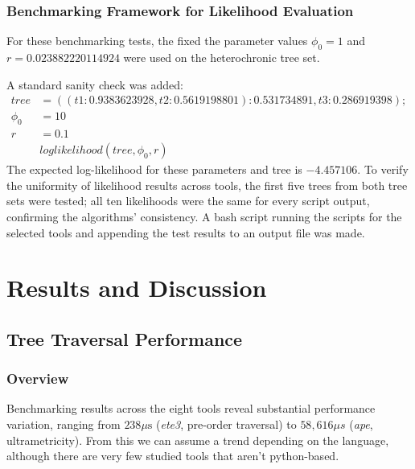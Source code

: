 \documentclass[11pt, a4paper]{article}
\newcommand{\ape}{\textit{ape}}
\newcommand{\ete}{\textit{ete3}}
\begin{document}
\subsubsection{Benchmarking Framework for Likelihood Evaluation}

For these benchmarking tests, the fixed the parameter values $\phi_0 = 1$ and $r = 0.023882220114924$ were used on the heterochronic tree set. 

A standard sanity check was added:
    \begin{align*}
        tree &= ((t1:0.9383623928,t2:0.5619198801):0.531734891,t3:0.286919398); \\
        \phi_0 &= 10\\
        r &= 0.1 \\
        &loglikelihood(tree, \phi_0,r)
    \end{align*}
The expected log-likelihood for these parameters and tree is $-4.457106$. 
To verify the uniformity of likelihood results across tools, the first five trees from both tree sets were tested; all ten likelihoods were the same for every script output, confirming the algorithms' consistency.
A bash script running the scripts for the selected tools and appending the test results to an output file was made. 

\section{Results and Discussion}

\subsection{Tree Traversal Performance}

\subsubsection{Overview}

Benchmarking results across the eight tools reveal substantial performance variation,
ranging from $238 \mu\text{s}$ (\ete, pre-order traversal) to $58{,}616\mu s$ (\ape, ultrametricity). From this we can assume a trend depending on the language, although there are very few studied tools that aren't python-based. 
\end{document}
